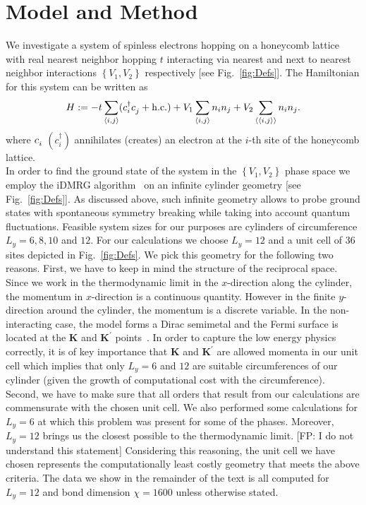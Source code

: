 \documentclass[aps,prx,10pt,twocolumn,floatfix,superscriptaddress,showpacs,numerical,footinbib]{revtex4-1}
\newcommand{\noteFP}[1]{{\color{magenta} [FP: #1]}}
\begin{document}
\section{\label{sec:modandmeth}Model and Method}
%
We investigate a system of spinless electrons hopping on a honeycomb lattice with real nearest neighbor hopping $t$ interacting via nearest and next to nearest neighbor interactions 
$\left\lbrace V_{1},V_{2}\right\rbrace$ respectively [see Fig.~\ref{fig:Defs}]. 
%
The Hamiltonian for this system can be written as
\begin{equation}
%
 H:=-t\sum_{\left\langle i,j\right\rangle}(c^{\dagger}_{i}c^{\vphantom{\dagger}}_{j}+ \mathrm{h.c.})+
V_{1}\sum_{\left\langle i,j\right\rangle }n_{i}n_{j}+
%
V_{2}\sum_{\left\langle \left\langle i,j\right\rangle \right\rangle }n_{i}n_{j}.
%
\label{eq:H}
\end{equation}
%
where $c_{i}^{\vphantom{\dagger}}$ $(c^{\dagger}_{i})$  annihilates (creates) an electron at the $i$-th site of the honeycomb lattice.\\
%
In order to find the ground state of the system in the $\left\lbrace V_{1},V_{2}\right\rbrace$ phase space
we employ the iDMRG algorithm~\cite{M08,W92,KZM13} on an infinite cylinder geometry [see Fig.~\ref{fig:Defs}].
%
As discussed above, such infinite geometry allows to probe ground states with spontaneous 
symmetry breaking while taking into account quantum fluctuations.
%
Feasible system sizes for our purposes are cylinders of circumference $L_{y} = 6,8,10$ and $12$.
%
For our calculations we choose $L_y=12$ and a unit cell of 36 sites depicted in Fig.~\ref{fig:Defs}.
%
We pick this geometry for the following two reasons.
%
First, 
%
we have to keep in mind the structure of the reciprocal space.
%
Since we work in the thermodynamic limit in the $x$-direction along the cylinder, the momentum in $x$-direction is a continuous quantity.
%
However in the finite $y$-direction around the cylinder, the momentum is a discrete variable.
%
In the non-interacting case, the model forms a Dirac semimetal and the Fermi surface is located at the 
$\mathbf{K}$ and $\mathbf{K}^{\prime}$ points~\cite{CastroNeto2009}.
%
In order to capture the low energy physics correctly, it is of key importance that $\mathbf{K}$ and $\mathbf{K}^{\prime}$ are allowed momenta in our unit cell which implies that only $L_y=6$ and $12$ are suitable circumferences of our cylinder (given the growth of computational cost with the circumference).
%
Second, we have to make sure that all orders that result from our calculations are commensurate with the chosen unit cell.
%
We also performed some calculations for $L_y=6$ at which this problem was present for some of the phases.
%
Moreover, $L_y=12$ brings us the closest possible to the thermodynamic limit. \noteFP{I do not understand this statement}
%
Considering this reasoning, the unit cell we have chosen represents the computationally least costly geometry that meets the above criteria.
%
The data we show in the remainder of the text is all computed for $L_y = 12$ and bond dimension $\chi = 1600$ unless otherwise stated.
\end{document}
